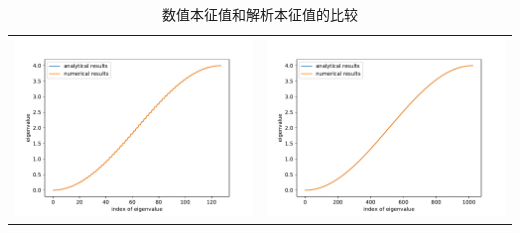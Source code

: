 \documentclass[a4paper,zihao=5,UTF8]{ctexart}
\begin{document}
\begin{table}[htbp]
\begin{tabular}[htbp]{cc}
			\includegraphics[scale=0.5]{1_compare_n=128.pdf} & \includegraphics[scale=0.5]{1_compare_n=1024.pdf}\\
		\end{tabular}
		\caption{数值本征值和解析本征值的比较}
		\label{1 eig diff plot}
	\end{table}
	
\end{document}
